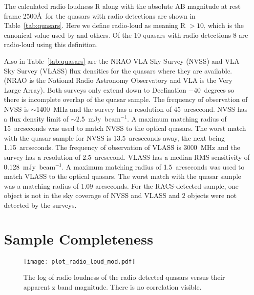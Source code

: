 \documentclass[a4paper,fleqn,usenatbib]{mnras}
\newcommand{\around}{$\sim$}
\begin{document}

The calculated radio loudness R along with the absolute AB magnitude at rest frame 2500\AA\  for the quasars with radio detections are shown in Table~\ref{tab:quasars}.  Here we define radio-loud as meaning R $> 10$, {which is the canonical value used by \citet{kellermann89} and others.}  Of the 10 quasars with radio detections 8 are radio-loud using this definition.  

Also in Table~\ref{tab:quasars} are the NRAO VLA Sky Survey (NVSS) \citep{condon98} and VLA Sky Survey (VLASS) \citep{gordon21} flux densities for the quasars where they are available.  {(NRAO is the National Radio Astronomy Observatory and VLA is the Very Large Array).} Both surveys only extend down to Declination $-$40~degrees so there is  incomplete overlap of the quasar sample.  The frequency of observation of NVSS is \around 1400~MHz and the survey has a resolution of 45~arcsecond.  NVSS has a flux density limit of \around 2.5~mJy~beam$^{-1}$.  {A maximum matching radius of 15~arcseconds was used to match NVSS to the optical quasars.}  The worst match with the quasar sample for NVSS is 13.5~arcseconds away, the next being 1.15~arcseconds.  The frequency of observation of VLASS is 3000~MHz and the survey has a resolution of 2.5~arcsecond.  VLASS has a median RMS sensitivity of 0.128~mJy~beam$^{-1}$.  {A maximum matching radius of 1.5~arcseconds was used to match VLASS to the optical quasars.}  The worst match with the quasar sample was a matching radius of  1.09 arcseconds.  For the RACS-detected sample, one object is not in the sky coverage of NVSS and VLASS and 2 objects were not detected by the surveys.  


\section{Sample Completeness}
\label{Sample_Completeness}


\begin{figure}
  \texttt{[image: plot\_radio\_loud\_mod.pdf]}  
  \caption{The log of radio loudness of the radio detected quasars versus their apparent z band magnitude.  There is no correlation visible.}
  \label{fig:plot_radio_loud_mod}
\end{figure}
\end{document}
